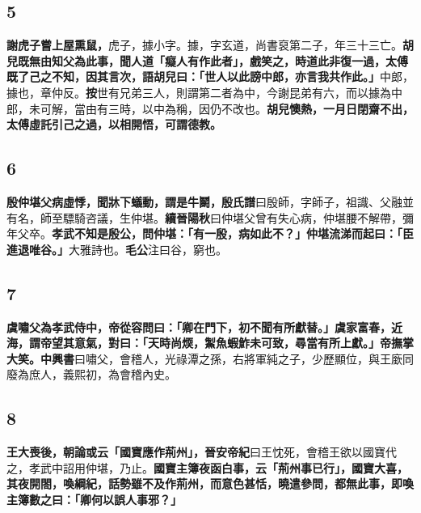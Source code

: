 \subsection*{5}

\textbf{謝虎子嘗上屋熏鼠，}{\footnotesize 虎子，據小字。據，字玄道，尚書裒第二子，年三十三亡。}\textbf{胡兒既無由知父為此事，聞人道「癡人有作此者」，戲笑之，時道此非復一過，太傅既了己之不知，因其言次，語胡兒曰：「世人以此謗中郎，亦言我共作此。」}{\footnotesize 中郎，據也，章仲反。\textbf{按}世有兄弟三人，則謂第二者為中，今謝昆弟有六，而以據為中郎，未可解，當由有三時，以中為稱，因仍不改也。}\textbf{胡兒懊熱，一月日閉齋不出，太傅虛託引己之過，以相開悟，可謂德教。}

\subsection*{6}

\textbf{殷仲堪父病虛悸，聞牀下蟻動，謂是牛鬬，}{\footnotesize \textbf{殷氏譜}曰殷師，字師子，祖識、父融並有名，師至驃騎咨議，生仲堪。\textbf{續晉陽秋}曰仲堪父曾有失心病，仲堪腰不解帶，彌年父卒。}\textbf{孝武不知是殷公，問仲堪：「有一殷，病如此不？」仲堪流涕而起曰：「臣進退唯谷。」}{\footnotesize 大雅詩也。\textbf{毛公}注曰谷，窮也。}

\subsection*{7}

\textbf{虞嘯父為孝武侍中，帝從容問曰：「卿在門下，初不聞有所獻替。」虞家富春，近海，謂帝望其意氣，對曰：「天時尚煗，䱥魚蝦鮓未可致，尋當有所上獻。」帝撫掌大笑。}{\footnotesize \textbf{中興書}曰嘯父，會稽人，光祿潭之孫，右將軍純之子，少歷顯位，與王廞同廢為庶人，義熙初，為會稽內史。}

\subsection*{8}

\textbf{王大喪後，朝論或云「國寶應作荊州」，}{\footnotesize \textbf{晉安帝紀}曰王忱死，會稽王欲以國寶代之，孝武中詔用仲堪，乃止。}\textbf{國寶主簿夜函白事，云「荊州事已行」，國寶大喜，其夜開閤，喚綱紀，話勢雖不及作荊州，而意色甚恬，曉遣參問，都無此事，即喚主簿數之曰：「卿何以誤人事邪？」}